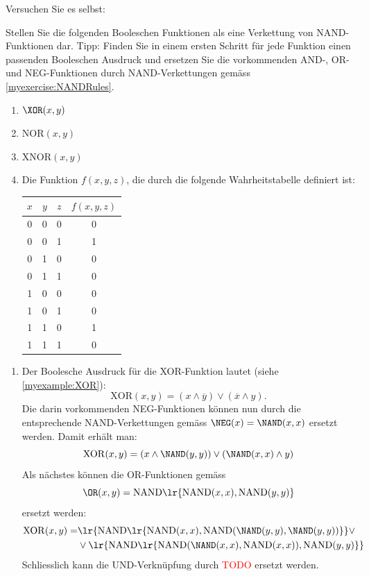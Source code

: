 Versuchen Sie es selbst:
\begin{myexercise}\label{myexercise:fromNAND2func}
    Stellen Sie die folgenden Booleschen Funktionen als eine Verkettung von NAND-Funktionen dar. Tipp: Finden Sie in einem ersten Schritt für jede Funktion einen passenden Booleschen Ausdruck und ersetzen Sie die vorkommenden AND-, OR- und NEG-Funktionen durch NAND-Verkettungen gemäss \cref{myexercise:NANDRules}.
    \begin{enumerate}
        \item $\XOR(x,y)$
        \item NOR$(x,y)$
        \item XNOR$(x,y)$
        \item Die Funktion $f(x,y,z)$, die durch die folgende Wahrheitstabelle definiert ist:
        \begin{center}
            \begin{tabular}{c|c|c||c}
                $x$&$y$&$z$&$f(x,y,z)$ \\
                \hline
                0&0&0&0 \\
                0&0&1&1 \\
                0&1&0&0 \\
                0&1&1&0 \\
                1&0&0&0 \\
                1&0&1&0 \\
                1&1&0&1 \\
                1&1&1&0  
            \end{tabular}
        \end{center}
    \end{enumerate}
\begin{myanswer}
    \begin{enumerate}
        \item Der Boolesche Ausdruck für die XOR-Funktion lautet (siehe \cref{myexample:XOR}): 
        $$\mathrm{XOR}(x,y) = (x\wedge \overline{y}) \vee (\overline{x} \wedge y).$$
        Die darin vorkommenden NEG-Funktionen können nun durch die entsprechende NAND-Verkettungen gemäss $\NEG(x)=\NAND(x,x)$ ersetzt werden. Damit erhält man:
        $$\mathrm{XOR}(x,y) = (x\wedge \NAND(y,y)) \vee (\NAND(x,x) \wedge y) $$
        Als nächstes können die OR-Funktionen gemäss $$\OR(x,y) = \mathrm{NAND} \lr{\mathrm{NAND}(x,x), \mathrm{NAND}(y,y)}$$ ersetzt werden:
        \begin{align*}
            \mathrm{XOR}(x,y) =& \lr{\mathrm{NAND} \lr{\mathrm{NAND}(x,x), \mathrm{NAND}(\NAND(y,y), \NAND(y,y)) } } \vee \\
            &\vee \lr{\mathrm{NAND} \lr{\mathrm{NAND}(\NAND(x,x), \mathrm{NAND}(x,x)), \mathrm{NAND}(y,y) }}   
        \end{align*}
        Schliesslich kann die UND-Verknüpfung durch \textcolor{Red}{TODO} ersetzt werden.
    \end{enumerate}
\end{myanswer}
\end{myexercise}

